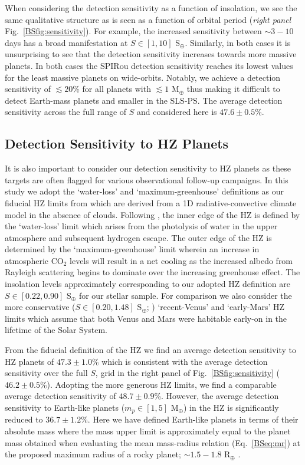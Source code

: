 When considering the detection sensitivity as a function of insolation, we see the same
qualitative structure as is seen as a function of orbital period (\emph{right panel}
Fig.~\ref{BSfig:sensitivity}). For example, the increased
sensitivity between $\sim 3-10$ days has a broad manifestation at $S \in [1,10]$ S$_{\oplus}$.
Similarly, in both cases it is unsurprising to see that the detection sensitivity increases
towards more massive planets. In both cases the SPIRou
detection sensitivity reaches its lowest values for the least massive planets on wide-orbits.
Notably, we achieve a detection sensitivity of $\lesssim 20$\% for all planets with
\msini{} $\lesssim 1$ M$_{\oplus}$ thus making it difficult to detect Earth-mass planets and
smaller in the SLS-PS. The average detection sensitivity across the full range of $S$ and
\msini{} considered here is $47.6 \pm 0.5$\%.


\subsection{Detection Sensitivity to HZ Planets}
It is also important to consider our detection sensitivity to HZ planets as these targets are often
flagged for various observational follow-up campaigns. In this study we adopt the `water-loss' and
`maximum-greenhouse' definitions
as our fiducial HZ limits from \cite{kopparapu13} which are derived from a 1D radiative-convective
climate model in the absence of clouds. Following \cite{kasting93}, the inner edge of the HZ is defined
by the `water-loss' limit which arises from the photolysis of water in the upper atmosphere and subsequent
hydrogen escape. The outer edge of the HZ is determined by the `maximum-greenhouse' limit wherein an
increase in atmospheric CO$_2$ levels will result in a net cooling as the increased albedo from Rayleigh
scattering begins to dominate over the increasing greenhouse effect. The insolation levels 
approximately corresponding to our adopted HZ definition are $S \in [0.22,0.90]$ S$_{\oplus}$ for our
stellar sample. For comparison we
also consider the more conservative ($S \in [0.20,1.48]$ S$_{\oplus}$; \citealt{kopparapu13})
`recent-Venus' and `early-Mars' HZ limits which assume that both Venus and Mars were habitable early-on
in the lifetime of the Solar System.

From the fiducial definition of the HZ we find an average
detection sensitivity to HZ planets of $47.3 \pm 1.0$\% which is consistent with the average
detection sensitivity over the full $S$,\msini{} grid in the right panel
of Fig.~\ref{BSfig:sensitivity}
($46.2 \pm 0.5$\%). Adopting the more generous HZ limits, we find a comparable average
detection sensitivity of $48.7 \pm 0.9$\%.
However, the average detection sensitivity to Earth-like planets ($m_p \in [1,5]$ M$_{\oplus}$) in the HZ
is significantly reduced to $36.7 \pm 1.2$\%. Here we have defined Earth-like planets in terms of their
absolute mass where the mass upper limit is approximately equal to 
the planet mass obtained when evaluating the mean mass-radius relation (Eq.~\ref{BSeq:mr}) at the
proposed maximum radius of a rocky planet; $\sim 1.5-1.8$ R$_{\oplus}$ \citep{weiss14, rogers15, fulton17}.

